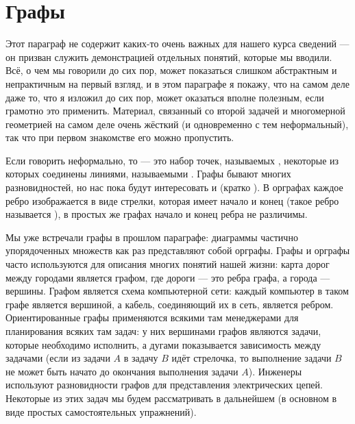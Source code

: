 \section{Графы}

Этот параграф не содержит каких-то очень важных для нашего курса сведений — он призван служить демонстрацией отдельных понятий, которые мы вводили. Всё, о чем мы говорили до сих пор, может показаться слишком абстрактным и непрактичным на первый взгляд, и в этом параграфе я покажу, что на самом деле даже то, что я изложил до сих пор, может оказаться вполне полезным, если грамотно это применить. Материал, связанный со второй задачей и многомерной геометрией на самом деле очень жёсткий (и одновременно с тем неформальный), так что при первом знакомстве его можно пропустить.

Если говорить неформально, то  — это набор точек, называемых , некоторые из которых соединены линиями, называемыми . Графы бывают многих разновидностей, но нас пока будут интересовать  и  (кратко ). В орграфах каждое ребро изображается в виде стрелки, которая имеет начало и конец (такое ребро называется ), в простых же графах начало и конец ребра не различимы.

Мы уже встречали графы в прошлом параграфе: диаграммы частично упорядоченных множеств как раз представляют собой орграфы. Графы и орграфы часто используются для описания многих понятий нашей жизни: карта дорог между городами является графом, где дороги — это ребра графа, а города — вершины. Графом является схема компьютерной сети: каждый компьютер в таком графе является вершиной, а кабель, соединяющий их в сеть, является ребром. Ориентированные графы применяются всякими там менеджерами для планирования всяких там задач: у них вершинами графов являются задачи, которые необходимо исполнить, а дугами показывается зависимость между задачами (если из задачи $A$ в задачу $B$ идёт стрелочка, то выполнение задачи $B$ не может быть начато до окончания выполнения задачи $A$). Инженеры используют разновидности графов для представления электрических цепей. Некоторые из этих задач мы будем рассматривать в дальнейшем (в основном в виде простых самостоятельных упражнений).

